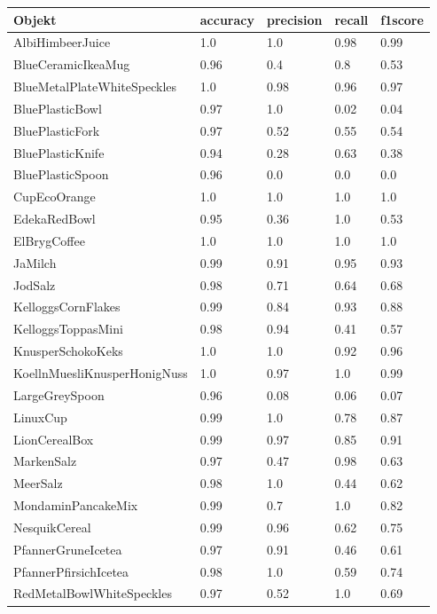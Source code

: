 \begin{table}
\centering
\small
{}
\begin{tabularx}{\textwidth}{Xllll}
\textbf{Objekt}	& \textbf{\gls{accuracy}} & \textbf{\gls{precision}}	& \textbf{\gls{recall}}	& \textbf{\gls{f1score}} \\ \hline
AlbiHimbeerJuice & 1.0 & 1.0 & 0.98 & 0.99 \\  
BlueCeramicIkeaMug & 0.96 & 0.4 & 0.8 & 0.53 \\  
BlueMetalPlateWhiteSpeckles & 1.0 & 0.98 & 0.96 & 0.97 \\  
BluePlasticBowl & 0.97 & 1.0 & 0.02 & 0.04 \\  
BluePlasticFork & 0.97 & 0.52 & 0.55 & 0.54 \\  
BluePlasticKnife & 0.94 & 0.28 & 0.63 & 0.38 \\  
BluePlasticSpoon & 0.96 & 0.0 & 0.0 & 0.0 \\  
CupEcoOrange & 1.0 & 1.0 & 1.0 & 1.0 \\  
EdekaRedBowl & 0.95 & 0.36 & 1.0 & 0.53 \\  
ElBrygCoffee & 1.0 & 1.0 & 1.0 & 1.0 \\  
JaMilch & 0.99 & 0.91 & 0.95 & 0.93 \\  
JodSalz & 0.98 & 0.71 & 0.64 & 0.68 \\  
KelloggsCornFlakes & 0.99 & 0.84 & 0.93 & 0.88 \\  
KelloggsToppasMini & 0.98 & 0.94 & 0.41 & 0.57 \\  
KnusperSchokoKeks & 1.0 & 1.0 & 0.92 & 0.96 \\  
KoellnMuesliKnusperHonigNuss & 1.0 & 0.97 & 1.0 & 0.99 \\  
LargeGreySpoon & 0.96 & 0.08 & 0.06 & 0.07 \\  
LinuxCup & 0.99 & 1.0 & 0.78 & 0.87 \\  
LionCerealBox & 0.99 & 0.97 & 0.85 & 0.91 \\  
MarkenSalz & 0.97 & 0.47 & 0.98 & 0.63 \\  
MeerSalz & 0.98 & 1.0 & 0.44 & 0.62 \\  
MondaminPancakeMix & 0.99 & 0.7 & 1.0 & 0.82 \\  
NesquikCereal & 0.99 & 0.96 & 0.62 & 0.75 \\  
PfannerGruneIcetea & 0.97 & 0.91 & 0.46 & 0.61 \\  
PfannerPfirsichIcetea & 0.98 & 1.0 & 0.59 & 0.74 \\  
RedMetalBowlWhiteSpeckles & 0.97 & 0.52 & 1.0 & 0.69 \\  

\end{tabularx}
\end{table}
